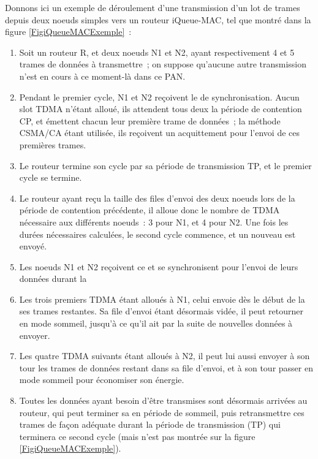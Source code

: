Donnons ici un exemple de déroulement d'une transmission d'un lot
de trames depuis deux noeuds simples vers un routeur iQueue-MAC,
tel que montré dans la figure \vref{FigiQueueMACExemple}~:
\begin{enumerate}
\item Soit un routeur R, et deux noeuds N1 et N2, ayant respectivement
4 et 5 trames de données à transmettre~; on suppose qu'aucune autre
transmission n'est en cours à ce moment-là dans ce PAN.
\item Pendant le premier cycle, N1 et N2 reçoivent le 
de synchronisation. Aucun slot TDMA n'étant alloué, ils attendent tous
deux la période de contention CP, et émettent chacun leur première trame
de données~; la méthode CSMA/CA étant utilisée, ils reçoivent un
acquittement pour l'envoi de ces premières trames.
\item Le routeur termine son cycle par sa période de transmission TP,
et le premier cycle se termine.
\item Le routeur ayant reçu la taille des files d'envoi des deux
noeuds lors de la période de contention précédente, il alloue donc
le nombre de  TDMA nécessaire aux différents noeuds~:
3 pour N1, et 4 pour N2. Une fois les durées nécessaires calculées,
le second cycle commence, et un nouveau  est envoyé.
\item Les noeuds N1 et N2 reçoivent ce  et se synchronisent
pour l'envoi de leurs données durant la 
\item Les trois premiers  TDMA étant alloués à N1, celui
envoie dès le début de la  ses trames restantes. Sa file
d'envoi étant désormais vidée, il peut retourner en mode sommeil, jusqu'à
ce qu'il ait par la suite de nouvelles données à envoyer.
\item Les quatre  TDMA suivants étant alloués à N2, il
peut lui aussi envoyer à son tour les trames de données restant dans sa
file d'envoi, et à son tour passer en mode sommeil pour économiser son
énergie.
\item Toutes les données ayant besoin d'être transmises sont désormais
arrivées au routeur, qui peut terminer sa  en période
de sommeil, puis retransmettre ces trames de façon adéquate durant
la période de transmission (TP) qui terminera ce second cycle (mais
n'est pas montrée sur la figure \vref{FigiQueueMACExemple}).
\end{enumerate}

\medskip

